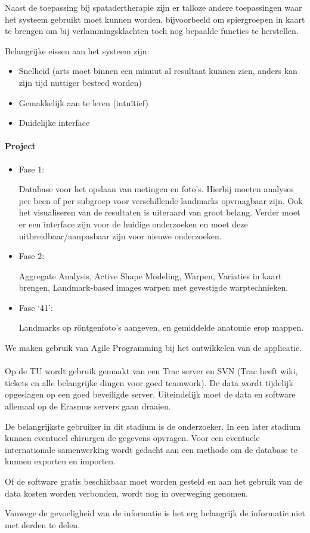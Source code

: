 Naast de toepassing bij spatadertherapie zijn er talloze andere toepassingen waar het systeem gebruikt moet kunnen worden, bijvoorbeeld om spiergroepen in kaart te brengen om bij verlammingsklachten toch nog bepaalde functies te herstellen. 

Belangrijke eissen aan het systeem zijn: 

\begin{itemize}
	\item Snelheid (arts moet binnen een minuut al resultaat kunnen zien, anders kan zijn tijd nuttiger besteed worden) 
	\item Gemakkelijk aan te leren (intu\"itief) 
	\item Duidelijke interface 
\end{itemize}

\paragraph{Project}
\begin{itemize}
\item Fase 1: 

Database voor het opslaan van metingen en foto's. Hierbij moeten analyses per been of per subgroep voor verschillende landmarks opvraagbaar zijn. Ook het visualiseren van de resultaten is uiteraard van groot belang. Verder moet er een interface zijn voor de huidige onderzoeken en moet deze uitbreidbaar/aanpasbaar zijn voor nieuwe onderzoeken. 

\item Fase 2: 

Aggregate Analysis, Active Shape Modeling, Warpen, Variaties in kaart brengen, Landmark-based images warpen met gevestigde warptechnieken. 

\item Fase `41': 

Landmarks op r\"ontgenfoto's aangeven, en gemiddelde anatomie erop mappen. 
\end{itemize}

We maken gebruik van Agile Programming bij het ontwikkelen van de applicatie.

\paragraph{}
Op de TU wordt gebruik gemaakt van een Trac server en SVN (Trac heeft wiki, tickets en alle belangrijke dingen voor goed teamwork). De data wordt tijdelijk opgeslagen op een goed beveiligde server. Uiteindelijk moet de data en software allemaal op de Erasmus servers gaan draaien. 

De belangrijkste gebruiker in dit stadium is de onderzoeker. In een later stadium kunnen eventueel chirurgen de gegevens opvragen. Voor een eventuele internationale samenwerking wordt gedacht aan een methode om de database te kunnen exporten en importen. 

Of de software gratis beschikbaar moet worden gesteld en aan het gebruik van de data kosten worden verbonden, wordt nog in overweging genomen. 

Vanwege de gevoeligheid van de informatie is het erg belangrijk de informatie niet met derden te delen. 
\pagebreak